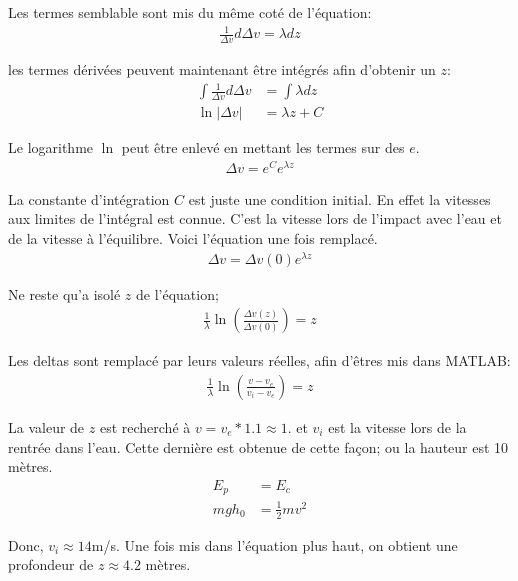 Les termes semblable sont mis du même coté de l'équation:
\begin{align}
\frac{1}{\Delta v}d\Delta v=\lambda dz
\end{align}

les termes dérivées peuvent maintenant être intégrés afin d'obtenir un $z$:
\begin{align}
\int\frac{1}{\Delta v}d\Delta v&=\int\lambda dz \\
\ln|\Delta v|&=\lambda z + C
\end{align}

Le logarithme $\ln$ peut être enlevé en mettant les termes sur des $e$. 
\begin{align}
\Delta v=e^Ce^{\lambda z}
\end{align}

La constante d'intégration $C$ est juste une condition initial. En effet la
vitesses aux limites de l'intégral est connue. C'est la vitesse lors de
l'impact avec l'eau et de la vitesse à l'équilibre. Voici l'équation une fois
remplacé.
\begin{align}
\Delta v=\Delta v(0)e^{\lambda z}
\end{align}

Ne reste qu'a isolé $z$ de l'équation;
\begin{align}
\frac{1}{\lambda}\ln(\frac{\Delta v(z)}{\Delta v(0)})=z
\end{align}

Les deltas sont remplacé par leurs valeurs réelles, afin d'êtres mis dans MATLAB:
\begin{align}
\frac{1}{\lambda}\ln(\frac{v-v_e}{v_i-v_e})=z
\end{align}

La valeur de $z$ est recherché à $v=v_e*1.1\approx1$. et $v_i$ est la vitesse
lors de la rentrée dans l'eau. Cette dernière est obtenue de cette façon; ou la
hauteur est 10 mètres.
\begin{align}
E_p&=E_c \\
mgh_0&=\frac{1}{2}mv^2
\end{align}

Donc, $v_i\approx14$m/s. Une fois mis dans l'équation plus haut, on obtient une
profondeur de $z\approx4.2$ mètres.